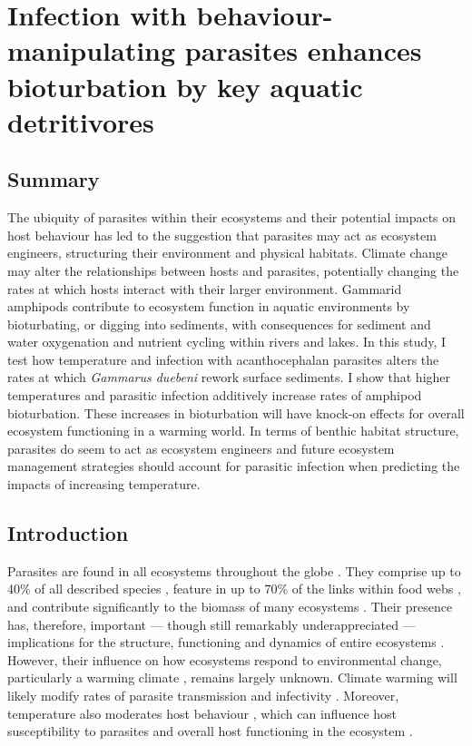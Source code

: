 \chapter[Infection with behaviour-manipulating parasites enhances bioturbation by key aquatic detritivores]{Infection with behaviour-manipulating parasites enhances bioturbation by key aquatic detritivores}
\label{chap:bioturb}

\section{Summary}
The ubiquity of parasites within their ecosystems and their potential impacts on host behaviour has led to the suggestion that parasites may act as ecosystem engineers, structuring their environment and physical habitats. Climate change may alter the relationships between hosts and parasites, potentially changing the rates at which hosts interact with their larger environment. Gammarid amphipods contribute to ecosystem function in aquatic environments by bioturbating, or digging into sediments, with consequences for sediment and water oxygenation and nutrient cycling within rivers and lakes. In this study, I test how temperature and infection with acanthocephalan parasites alters the rates at which \emph{Gammarus duebeni} rework surface sediments. I show that higher temperatures and parasitic infection additively increase rates of amphipod bioturbation. These increases in bioturbation will have knock-on effects for overall ecosystem functioning in a warming world. In terms of benthic habitat structure, parasites do seem to act as ecosystem engineers and future ecosystem management strategies should account for parasitic infection when predicting the impacts of increasing temperature.

\section{Introduction}

Parasites are found in all ecosystems throughout the globe \citep{jorge2018}. They comprise up to 40\% of all described species \citep{dobson2008}, feature in up to 70\% of the links within food webs \citep{dunne2013}, and contribute significantly to the biomass of many ecosystems \citep{kruis2008}. Their presence has, therefore, important --- though still remarkably underappreciated --- implications for the structure, functioning and dynamics of entire ecosystems \citep{amundsen2009, dunne2013}. However, their influence on how ecosystems respond to environmental change, particularly a warming climate \citep{kutz2005, hoberg2007}, remains largely unknown. Climate warming will likely modify rates of parasite transmission \citep{mouritsen1997} and infectivity \citep{studer2010}. Moreover, temperature also moderates host behaviour \citep{issartel2005, abram2017}, which can influence host susceptibility to parasites \citep{morley2014} and overall host functioning in the ecosystem \citep{ogorman2012}.

